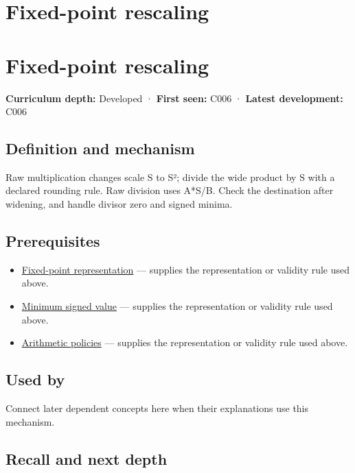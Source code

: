 \hypertarget{appendix-3333db47830f}{}
\section*{Fixed-point rescaling}
\section{Fixed-point rescaling}\label{appendix-3333db47830f-fixed-point-rescaling}

\textbf{Curriculum depth:} Developed · \textbf{First seen:} C006 · \textbf{Latest development:} C006

\subsection{Definition and mechanism}\label{appendix-3333db47830f-definition-and-mechanism}

Raw multiplication changes scale S to S²; divide the wide product by S with a declared rounding rule. Raw division uses A*S/B. Check the destination after widening, and handle divisor zero and signed minima.

\subsection{Prerequisites}\label{appendix-3333db47830f-prerequisites}

\begin{itemize}
\tightlist
\item
  \hyperref[appendix-1d0dbe8924cc]{Fixed-point representation} --- supplies the representation or validity rule used above.
\item
  \hyperref[appendix-05f39b10364d]{Minimum signed value} --- supplies the representation or validity rule used above.
\item
  \hyperref[appendix-2ed044358b82]{Arithmetic policies} --- supplies the representation or validity rule used above.
\end{itemize}

\subsection{Used by}\label{appendix-3333db47830f-used-by}

Connect later dependent concepts here when their explanations use this mechanism.

\subsection{Recall and next depth}\label{appendix-3333db47830f-recall-and-next-depth}

